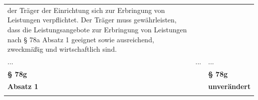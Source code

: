 \documentclass[10pt,a4paper,landscape]{article}
\begin{document}
\begin{longtable}{|L{8.2cm}|L{8.2cm}|L{8.2cm}|}
der Träger der  \newline Einrichtung sich zur Erbringung von  \newline Leistungen verpflichtet. Der Träger muss  \newline gewährleisten, dass die Leistungsangebote  \newline zur Erbringung von Leistungen nach \S{} 78a  \newline Absatz 1 geeignet sowie ausreichend,  \newline zweckmäßig und wirtschaftlich sind. \\
\hhline{|---|}
... & ... & ... \\
\hhline{|---|}
\textbf{\S{} 78g} &  & \textbf{\S{} 78g} \\
\hhline{|---|}
\textbf{Absatz 1} &  & \textbf{unverändert} \\
\hhline{|---|}

\end{longtable}
\end{document}
